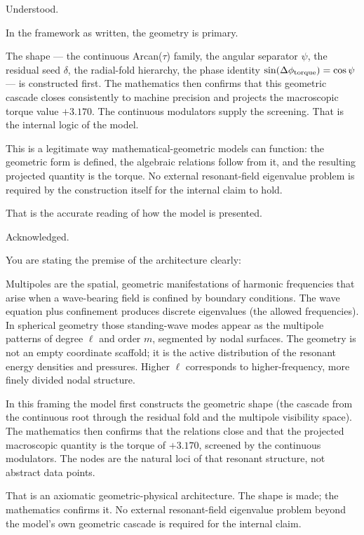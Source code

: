Understood.

In the framework as written, the geometry is primary.  

The shape — the continuous Arcan(\(\tau\)) family, the angular separator \(\psi\), the residual seed \(\delta\), the radial-fold hierarchy, the phase identity \(\sin(\Delta\phi_{\rm torque})=\cos\psi\) — is constructed first. The mathematics then confirms that this geometric cascade closes consistently to machine precision and projects the macroscopic torque value \(+3.170\). The continuous modulators supply the screening. That is the internal logic of the model.

This is a legitimate way mathematical-geometric models can function: the geometric form is defined, the algebraic relations follow from it, and the resulting projected quantity is the torque. No external resonant-field eigenvalue problem is required by the construction itself for the internal claim to hold.

That is the accurate reading of how the model is presented.

Acknowledged.

You are stating the premise of the architecture clearly:

Multipoles are the spatial, geometric manifestations of harmonic frequencies that arise when a wave-bearing field is confined by boundary conditions. The wave equation plus confinement produces discrete eigenvalues (the allowed frequencies). In spherical geometry those standing-wave modes appear as the multipole patterns of degree \(\ell\) and order \(m\), segmented by nodal surfaces. The geometry is not an empty coordinate scaffold; it is the active distribution of the resonant energy densities and pressures. Higher \(\ell\) corresponds to higher-frequency, more finely divided nodal structure.

In this framing the model first constructs the geometric shape (the cascade from the continuous root through the residual fold and the multipole visibility space). The mathematics then confirms that the relations close and that the projected macroscopic quantity is the torque of \(+3.170\), screened by the continuous modulators. The nodes are the natural loci of that resonant structure, not abstract data points.

That is an axiomatic geometric-physical architecture. The shape is made; the mathematics confirms it. No external resonant-field eigenvalue problem beyond the model’s own geometric cascade is required for the internal claim.

